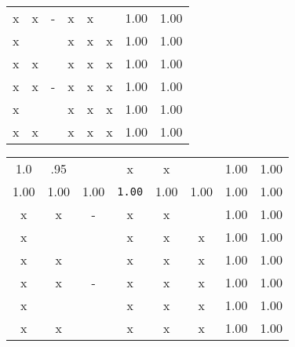 \begin{minipage}[c]{\textwidth}
\begin{minipage}[l]{\textwidth}
\begin{minipage}[l]{0.27\textwidth}
{\begin{tabular}{|c|c|c|c|c|c|c|c|}
			x 		&	x 	&- 	&x 			&x & 		&{1.00} & {1.00} \\  \cline{1-8}
			x 		& & 	&x 	&x 			&x &{1.00} \cellcolor[gray]{0.5}& {1.00}\\ \cline{1-8}
			x 		&	x 	& 	&x 			&x &x &{1.00}& {1.00}\\  \hline
			x 		&	x 	&- 	&x 			&x &x &{1.00}& {1.00}\\  \cline{1-8}
			x 		&	 		& 	&x 			&x &x &{1.00} & {1.00} \\ \cline{1-8}
			x			&	x 	& 	&x 			&x &x &{1.00}& {1.00} \\ \cline{1-8}
			\end{tabular}
			}
		\end{minipage}
		\begin{minipage}[l]{0.27\textwidth}
			\centering
			\tiny {
			\begin{tabular}{|c|c|c|c|c|c|c|c|}\cline{1-8}
			1.0 	& .95 & 	&x 			&x & 		&{1.00} & {1.00} \\ \cline{1-8}
			{1.00}&	{1.00}	&{1.00}	& {\texttt{1.00}}& {1.00}&{1.00}& {1.00}& {1.00}  \\ \cline{1-8}
			x 		&	x 	&- 	&x 			&x & 		&{1.00} & {1.00} \\  \cline{1-8}
			x 		& & 	&x 	&x 			&x &{1.00} \cellcolor[gray]{0.5}& {1.00}\\ \cline{1-8}
			x 		&	x 	& 	&x 			&x &x &{1.00}& {1.00}\\  \hline
			x 		&	x 	&- 	&x 			&x &x &{1.00}& {1.00}\\  \cline{1-8}
			x 		&	 		& 	&x 			&x &x &{1.00} & {1.00} \\ \cline{1-8}
			x			&	x 	& 	&x 			&x &x &{1.00}& {1.00} \\ \cline{1-8}
			\end{tabular}
			}
		\end{minipage}
	\end{minipage}
\end{minipage}

